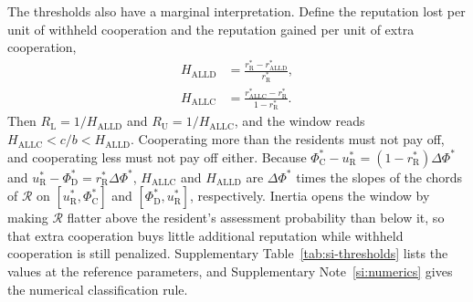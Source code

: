 \documentclass[10pt]{wlscirep}
\newcommand{\Rmap}{\mathscr{R}}            %
\newcommand{\rR}{r_{\mathrm{R}}^{*}}
\newcommand{\uR}{u_{\mathrm{R}}^{*}}
\newcommand{\PhiCs}{\Phi^{*}_{\mathrm{C}}}
\newcommand{\PhiDs}{\Phi^{*}_{\mathrm{D}}}
\newcommand{\dPhi}{\Delta\Phi^{*}}
\newcommand{\ALLC}{\mathrm{ALLC}}
\newcommand{\ALLD}{\mathrm{ALLD}}
\theoremstyle{plain}
\theoremstyle{remark}
\begin{document}
The thresholds also have a marginal interpretation. Define the reputation lost per unit of withheld cooperation and the reputation gained per unit of extra cooperation,
\begin{equation}
\begin{aligned}
H_{\ALLD}&=\frac{\rR-r^*_{\ALLD}}{\rR},\\[2pt]
H_{\ALLC}&=\frac{r^*_{\ALLC}-\rR}{1-\rR}.
\end{aligned}
\label{eq:s-HALL}
\end{equation}
Then $R_{\mathrm L}=1/H_{\ALLD}$ and $R_{\mathrm U}=1/H_{\ALLC}$, and the window reads $H_{\ALLC}<c/b<H_{\ALLD}$. Cooperating more than the residents must not pay off, and cooperating less must not pay off either. Because $\PhiCs-\uR=(1-\rR)\dPhi$ and $\uR-\PhiDs=\rR\dPhi$, $H_{\ALLC}$ and $H_{\ALLD}$ are $\dPhi$ times the slopes of the chords of $\Rmap$ on $[\uR,\PhiCs]$ and $[\PhiDs,\uR]$, respectively. Inertia opens the window by making $\Rmap$ flatter above the resident's assessment probability than below it, so that extra cooperation buys little additional reputation while withheld cooperation is still penalized. Supplementary Table~\ref{tab:si-thresholds} lists the values at the reference parameters, and Supplementary Note~\ref{si:numerics} gives the numerical classification rule.
\end{document}
